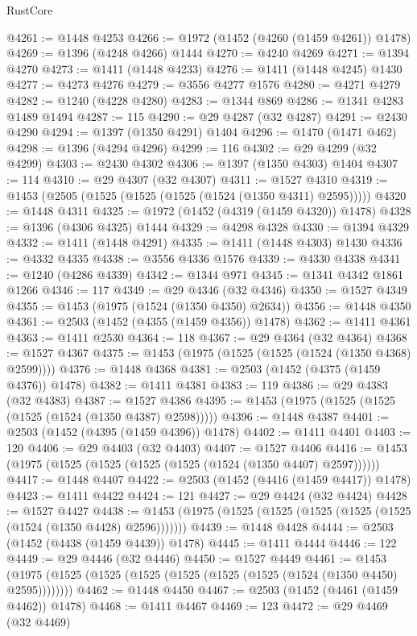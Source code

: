 \begin{lexlean}{RustCore}
\begin{coremodule}
@4261 := @1448 @4253
@4266 := @1972 (@1452 (@4260 (@1459 @4261)) @1478)
@4269 := @1396 (@4248 @4266) @1444
@4270 := @4240 @4269
@4271 := @1394 @4270
@4273 := @1411 (@1448 @4233)
@4276 := @1411 (@1448 @4245) @1430
@4277 := @4273 @4276
@4279 := @3556 @4277 @1576
@4280 := @4271 @4279
@4282 := @1240 (@4228 @4280)
@4283 := @1344 @869
@4286 := @1341 @4283 @1489 @1494
@4287 := 115
@4290 := @29 @4287 (@32 @4287)
@4291 := @2430 @4290
@4294 := @1397 (@1350 @4291) @1404
@4296 := @1470 (@1471 @462)
@4298 := @1396 (@4294 @4296)
@4299 := 116
@4302 := @29 @4299 (@32 @4299)
@4303 := @2430 @4302
@4306 := @1397 (@1350 @4303) @1404
@4307 := 114
@4310 := @29 @4307 (@32 @4307)
@4311 := @1527 @4310
@4319 := @1453 (@2505 (@1525 (@1525 (@1525 (@1524 (@1350 @4311) @2595)))))
@4320 := @1448 @4311
@4325 := @1972 (@1452 (@4319 (@1459 @4320)) @1478)
@4328 := @1396 (@4306 @4325) @1444
@4329 := @4298 @4328
@4330 := @1394 @4329
@4332 := @1411 (@1448 @4291)
@4335 := @1411 (@1448 @4303) @1430
@4336 := @4332 @4335
@4338 := @3556 @4336 @1576
@4339 := @4330 @4338
@4341 := @1240 (@4286 @4339)
@4342 := @1344 @971
@4345 := @1341 @4342 @1861 @1266
@4346 := 117
@4349 := @29 @4346 (@32 @4346)
@4350 := @1527 @4349
@4355 := @1453 (@1975 (@1524 (@1350 @4350) @2634))
@4356 := @1448 @4350
@4361 := @2503 (@1452 (@4355 (@1459 @4356)) @1478)
@4362 := @1411 @4361
@4363 := @1411 @2530
@4364 := 118
@4367 := @29 @4364 (@32 @4364)
@4368 := @1527 @4367
@4375 := @1453 (@1975 (@1525 (@1525 (@1524 (@1350 @4368) @2599))))
@4376 := @1448 @4368
@4381 := @2503 (@1452 (@4375 (@1459 @4376)) @1478)
@4382 := @1411 @4381
@4383 := 119
@4386 := @29 @4383 (@32 @4383)
@4387 := @1527 @4386
@4395 := @1453 (@1975 (@1525 (@1525 (@1525 (@1524 (@1350 @4387) @2598)))))
@4396 := @1448 @4387
@4401 := @2503 (@1452 (@4395 (@1459 @4396)) @1478)
@4402 := @1411 @4401
@4403 := 120
@4406 := @29 @4403 (@32 @4403)
@4407 := @1527 @4406
@4416 := @1453 (@1975 (@1525 (@1525 (@1525 (@1525 (@1524 (@1350 @4407) @2597))))))
@4417 := @1448 @4407
@4422 := @2503 (@1452 (@4416 (@1459 @4417)) @1478)
@4423 := @1411 @4422
@4424 := 121
@4427 := @29 @4424 (@32 @4424)
@4428 := @1527 @4427
@4438 := @1453 (@1975 (@1525 (@1525 (@1525 (@1525 (@1525 (@1524 (@1350 @4428) @2596)))))))
@4439 := @1448 @4428
@4444 := @2503 (@1452 (@4438 (@1459 @4439)) @1478)
@4445 := @1411 @4444
@4446 := 122
@4449 := @29 @4446 (@32 @4446)
@4450 := @1527 @4449
@4461 := @1453 (@1975 (@1525 (@1525 (@1525 (@1525 (@1525 (@1525 (@1524 (@1350 @4450) @2595))))))))
@4462 := @1448 @4450
@4467 := @2503 (@1452 (@4461 (@1459 @4462)) @1478)
@4468 := @1411 @4467
@4469 := 123
@4472 := @29 @4469 (@32 @4469)

\end{coremodule}
\end{lexlean}
